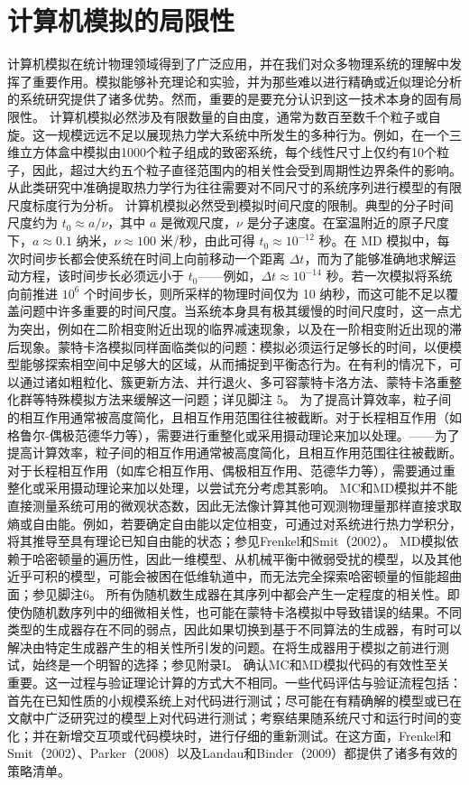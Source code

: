 \section{计算机模拟的局限性}\label{ux8ba1ux7b97ux673aux6a21ux62dfux7684ux5c40ux9650ux6027}
计算机模拟在统计物理领域得到了广泛应用，并在我们对众多物理系统的理解中发挥了重要作用。模拟能够补充理论和实验，并为那些难以进行精确或近似理论分析的系统研究提供了诸多优势。然而，重要的是要充分认识到这一技术本身的固有局限性。
计算机模拟必然涉及有限数量的自由度，通常为数百至数千个粒子或自旋。这一规模远远不足以展现热力学大系统中所发生的多种行为。例如，在一个三维立方体盒中模拟由1000个粒子组成的致密系统，每个线性尺寸上仅约有10个粒子，因此，超过大约五个粒子直径范围内的相关性会受到周期性边界条件的影响。从此类研究中准确提取热力学行为往往需要对不同尺寸的系统序列进行模型的有限尺度标度行为分析。
计算机模拟必然受到模拟时间尺度的限制。典型的分子时间尺度约为 \(t_0 \approx a/\nu\)，其中 \(a\) 是微观尺度，\(\nu\) 是分子速度。在室温附近的原子尺度下，\(a \approx 0.1\) 纳米，\(\nu \approx 100\) 米/秒，由此可得 \(t_0 \approx 10^{-12}\) 秒。在 MD 模拟中，每次时间步长都会使系统在时间上向前移动一个距离 \(\Delta t\)，而为了能够准确地求解运动方程，该时间步长必须远小于 \(t_0\)——例如，\(\Delta t \approx 10^{-14}\) 秒。若一次模拟将系统向前推进 \(10^6\) 个时间步长，则所采样的物理时间仅为 10 纳秒，而这可能不足以覆盖问题中许多重要的时间尺度。当系统本身具有极其缓慢的时间尺度时，这一点尤为突出，例如在二阶相变附近出现的临界减速现象，以及在一阶相变附近出现的滞后现象。蒙特卡洛模拟同样面临类似的问题：模拟必须运行足够长的时间，以便模型能够探索相空间中足够大的区域，从而捕捉到平衡态行为。在有利的情况下，可以通过诸如粗粒化、簇更新方法、并行退火、多可容蒙特卡洛方法、蒙特卡洛重整化群等特殊模拟方法来缓解这一问题；详见脚注 5。
为了提高计算效率，粒子间的相互作用通常被高度简化，且相互作用范围往往被截断。对于长程相互作用（如格鲁尔-偶极范德华力等），需要进行重整化或采用摄动理论来加以处理。——为了提高计算效率，粒子间的相互作用通常被高度简化，且相互作用范围往往被截断。对于长程相互作用（如库仑相互作用、偶极相互作用、范德华力等），需要通过重整化或采用摄动理论来加以处理，以尝试充分考虑其影响。
MC和MD模拟并不能直接测量系统可用的微观状态数，因此无法像计算其他可观测物理量那样直接求取熵或自由能。例如，若要确定自由能以定位相变，可通过对系统进行热力学积分，将其推导至具有理论已知自由能的状态；参见Frenkel和Smit（2002）。
MD模拟依赖于哈密顿量的遍历性，因此一维模型、从机械平衡中微弱受扰的模型，以及其他近乎可积的模型，可能会被困在低维轨道中，而无法完全探索哈密顿量的恒能超曲面；参见脚注6。
所有伪随机数生成器在其序列中都会产生一定程度的相关性。即使伪随机数序列中的细微相关性，也可能在蒙特卡洛模拟中导致错误的结果。不同类型的生成器存在不同的弱点，因此如果切换到基于不同算法的生成器，有时可以解决由特定生成器产生的相关性所引发的问题。在将生成器用于模拟之前进行测试，始终是一个明智的选择；参见附录I。
确认MC和MD模拟代码的有效性至关重要。这一过程与验证理论计算的方式大不相同。一些代码评估与验证流程包括：首先在已知性质的小规模系统上对代码进行测试；尽可能在有精确解的模型或已在文献中广泛研究过的模型上对代码进行测试；考察结果随系统尺寸和运行时间的变化；并在新增交互项或代码模块时，进行仔细的重新测试。在这方面，Frenkel和Smit（2002）、Parker（2008）以及Landau和Binder（2009）都提供了诸多有效的策略清单。
